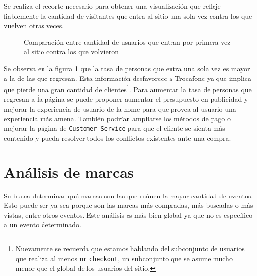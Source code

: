 \documentclass[a4paper]{article}
\begin{document}
Se realiza el recorte necesario para obtener una visualización que refleje fiablemente la cantidad de visitantes que entra al sitio una sola vez contra los que vuelven otras veces. 

\begin{figure}[h!]
	\caption{Comparación entre cantidad de usuarios que entran por primera vez al sitio contra los que volvieron}
	\label{fig:newvsreturning}
\end{figure}

Se observa en la figura \ref{fig:newvsreturning} que la tasa de personas que entra una sola vez es mayor a la de las que regresan. Esta información desfavorece a Trocafone ya que implica que pierde una gran cantidad de clientes\footnote{Nuevamente se recuerda que estamos hablando del subconjunto de usuarios que realiza al menos un \texttt{checkout}, un subconjunto que se asume mucho menor que el global de los usuarios del sitio.}. Para aumentar la tasa de personas que regresan a ĺa página se puede proponer aumentar el presupuesto en publicidad y mejorar la experiencia de usuario de la home para que provea al usuario una experiencia más amena. También podrían ampliarse los métodos de pago o mejorar la página de \texttt{Customer Service} para que el cliente se sienta más contenido y pueda resolver todos los conflictos existentes ante una compra.

\section{Análisis de marcas}

Se busca determinar qué marcas son las que reúnen la mayor cantidad de eventos. Esto puede ser ya sea porque son las marcas más compradas, más buscadas o más vistas, entre otros eventos. Este análisis es más bien global ya que no es específico a un evento determinado.
\end{document}

